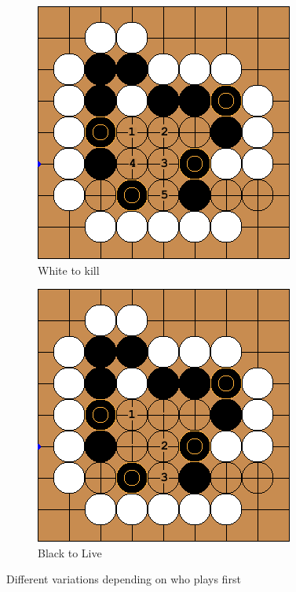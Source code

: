 \documentclass{l4proj}
\begin{document}
\begin{figure}[!ht]
\centering
\begin{subfigure}[b]{0.40\textwidth}
\centering
\includegraphics[width=\textwidth]{ep2/1a.png}
\caption{ White to kill}
\label{fig:ep2-b}
\end{subfigure}\qquad
\begin{subfigure}[b]{0.40\textwidth}
\centering
\includegraphics[width=\textwidth]{ep2/1b.png}
\caption{Black to Live }
\label{fig:ep2-a}
\end{subfigure}
\caption{Different variations depending on who plays first }
\label{fig:ep2}
\end{figure}
\end{document}
